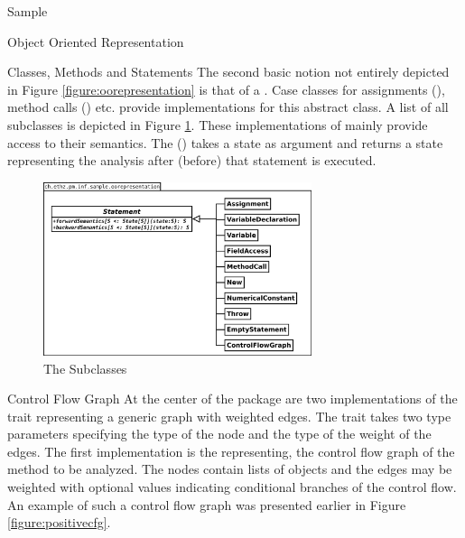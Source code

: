 \begin{chapter}{Sample}
\begin{section}{Object Oriented Representation}
\begin{subsection}{Classes, Methods and Statements}
			The second basic notion not entirely depicted in Figure \ref{figure:oorepresentation} is that of a . Case classes for assignments (), method calls () etc. provide implementations for this abstract class. A list of all subclasses is depicted in Figure \ref{figure:Statement}. These implementations of  mainly provide access to their semantics. The  () takes a state as argument and returns a state representing the analysis after (before) that statement is executed.

			\begin{figure}
				\centering
				\includegraphics[width=0.7\textwidth]{Diagrams/Statement.png}
				\caption{The  Subclasses}
				\label{figure:Statement}
			\end{figure}

		\end{subsection}


		\begin{subsection}{Control Flow Graph}
			At the center of the package are two implementations of the  trait representing a generic graph with weighted edges. The trait takes two type parameters specifying the type of the node and the type of the weight of the edges. The first implementation is the  representing, the control flow graph of the method to be analyzed. The nodes contain lists of  objects and the edges may be weighted with optional  values indicating conditional branches of the control flow. An example of such a control flow graph was presented earlier in Figure \ref{figure:positivecfg}.
		\end{subsection}



\end{section}
\end{chapter}
